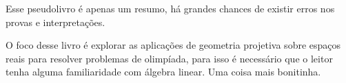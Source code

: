Esse pseudolivro é apenas um resumo, há grandes chances de existir erros nos provas e interpretações.

O foco desse livro é explorar as aplicações de geometria projetiva sobre espaços reais para resolver problemas de olimpíada, para isso é necessário que o leitor tenha alguma familiaridade com álgebra linear.
Uma coisa mais bonitinha.